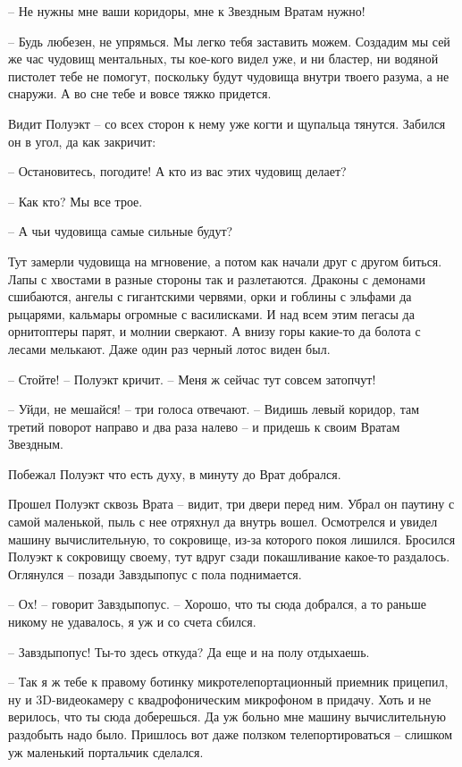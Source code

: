 \documentclass[ebook,oneside,final,openright]{memoir}
\begin{document}
– Не нужны мне ваши коридоры, мне к Звездным Вратам нужно!\par
– Будь любезен, не упрямься. Мы легко тебя заставить можем. Создадим мы сей же час чудовищ ментальных, ты кое-кого видел уже, и ни бластер, ни водяной пистолет тебе не помогут, поскольку будут чудовища внутри твоего разума, а не снаружи. А во сне тебе и вовсе тяжко придется.\par
\par
Видит Полуэкт – со всех сторон к нему уже когти и щупальца тянутся. Забился он в угол, да как закричит:\par
– Остановитесь, погодите! А кто из вас этих чудовищ делает?\par
– Как кто? Мы все трое.\par
– А чьи чудовища самые сильные будут?\par
Тут замерли чудовища на мгновение, а потом как начали друг с другом биться. Лапы с хвостами в разные стороны так и разлетаются. Драконы с демонами сшибаются, ангелы с гигантскими червями, орки и гоблины с эльфами да рыцарями, кальмары огромные с василисками. И над всем этим пегасы да орнитоптеры парят, и молнии сверкают. А внизу горы какие-то да болота с лесами мелькают. Даже один раз черный лотос виден был. \par
– Стойте! – Полуэкт кричит. – Меня ж сейчас тут совсем затопчут!\par
– Уйди, не мешайся! – три голоса отвечают. – Видишь левый коридор, там третий поворот направо и два раза налево – и придешь к своим Вратам Звездным.\par
\par
Побежал Полуэкт что есть духу, в минуту до Врат добрался.\par
\par
Прошел Полуэкт сквозь Врата – видит, три двери перед ним. Убрал он паутину с самой маленькой, пыль с нее отряхнул да внутрь вошел. Осмотрелся и увидел машину вычислительную, то сокровище, из-за которого покоя лишился. Бросился Полуэкт к сокровищу своему, тут вдруг сзади покашливание какое-то раздалось. Оглянулся – позади Завздыпопус с пола поднимается.\par
– Ох! – говорит Завздыпопус. – Хорошо, что ты сюда добрался, а то раньше никому не удавалось, я уж и со счета сбился.\par
– Завздыпопус! Ты-то здесь откуда? Да еще и на полу отдыхаешь.\par
– Так я ж тебе к правому ботинку микротелепортационный приемник прицепил, ну и 3D-видеокамеру с квадрофоническим микрофоном в придачу. Хоть и не верилось, что ты сюда доберешься. Да уж больно мне машину вычислительную раздобыть надо было. Пришлось вот даже ползком телепортироваться – слишком уж маленький портальчик сделался.\par
\end{document}
